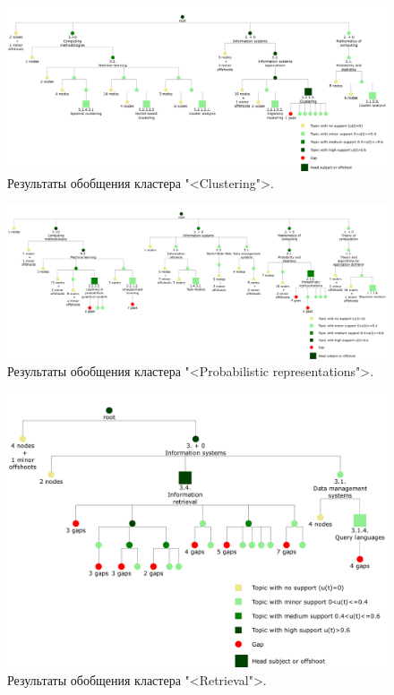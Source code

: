 \documentclass[12pt]{article}
\begin{document}
\begin{figure}
	\centering
	\vspace{-2cm}
	\includegraphics[width=\textheight, angle=90, origin=c, clip]{images/cluster_lift_tree_01_clustering}
	\caption{Результаты обобщения кластера "<Clustering">.}
	\label{fig:tax_clustering}
\end{figure}

\begin{figure}
	\centering
	\vspace{-2cm}
	\includegraphics[width=\textheight, angle=90, origin=c, clip]{images/cluster_lift_tree_02_prob_representations}
	\caption{Результаты обобщения кластера "<Probabilistic representations">.}
	\label{fig:tax_prob_representations}
\end{figure}

\begin{figure}
	\centering
	\vspace{-2cm}
	\includegraphics[width=\textheight, angle=90, origin=c, clip]{images/cluster_lift_tree_04_retrieval}
	\caption{Результаты обобщения кластера "<Retrieval">.}
	\label{fig:tax_retrieval}
\end{figure}
\end{document}
